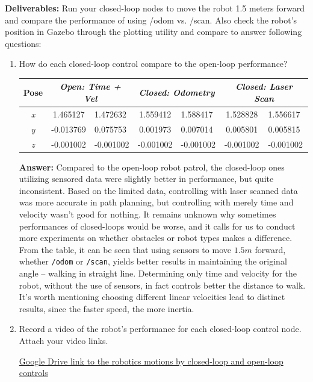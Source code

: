 \documentclass[12pt]{article}
\begin{document}
\textbf{Deliverables:}
Run your closed-loop nodes to move the robot 1.5 meters forward and compare the performance of using /odom vs. /scan. Also check the robot’s position in Gazebo through the plotting utility and compare to answer following questions:
\begin{enumerate}
    \item How do each closed-loop control compare to the open-loop performance?
    
    \begin{table}[H]
        \centering
        \begin{tabular}{|c|cl|cl|cl|}
        \hline
        Pose       & \multicolumn{2}{c|}{\textit{Open: Time + Vel}} & \multicolumn{2}{c|}{\textit{Closed: Odometry}} & \multicolumn{2}{c|}{\textit{Closed: Laser Scan}} \\ \hline
        \textit{x} & \multicolumn{1}{c|}{1.465127}    & 1.472632    & \multicolumn{1}{c|}{1.559412}    & 1.588417    & \multicolumn{1}{c|}{1.528828}     & 1.556617     \\ \hline
        \textit{y} & \multicolumn{1}{c|}{-0.013769}    & 0.075753    & \multicolumn{1}{c|}{0.001973}    & 0.007014    & \multicolumn{1}{c|}{0.005801}     & 0.005815     \\ \hline
        \textit{z} & \multicolumn{1}{c|}{-0.001002}   & -0.001002   & \multicolumn{1}{c|}{-0.001002}   & -0.001002   & \multicolumn{1}{c|}{-0.001002}    & -0.001002    \\ \hline
        \end{tabular}
        \end{table}
        \vspace{-2ex}

    \textbf{Answer: }Compared to the open-loop robot patrol, the closed-loop ones utilizing sensored data were slightly better in performance, but quite inconsistent. Based on the limited data, controlling with laser scanned data was more accurate in path planning, but controlling with merely time and velocity wasn't good for nothing. It remains unknown why sometimes performances of closed-loops would be worse, and it calls for us to conduct more experiments on whether obstacles or robot types makes a difference.
    \\From the table, it can be seen that using sensors to move $1.5m$ forward, whether \texttt{/odom} or \texttt{/scan}, yields better results in maintaining the original angle -- walking in straight line. Determining only time and velocity for the robot, without the use of sensors, in fact controls better the distance to walk. It's worth mentioning choosing different linear velocities lead to distinct results, since the faster speed, the more inertia.

    \item Record a video of the robot’s performance for each closed-loop control node. Attach your video links.
    
    \href{https://drive.google.com/file/d/1X76EqsRq0fVXSCenQvJV1aQPNA97RqPi/view?usp=sharing}{Google Drive link to the robotics motions by closed-loop and open-loop controls}

\end{enumerate}
\end{document}
